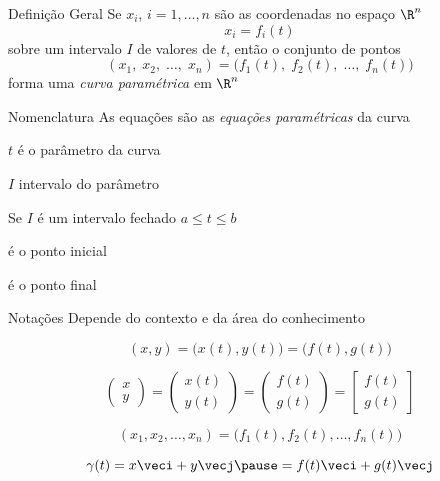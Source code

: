 \documentclass[fleqn,utf8,aspectratio=169,12pt]{beamer}
\begin{document}
\begin{frame}{Definição Geral}
  Se $x_i$, $i=1, \dots, n$ são as coordenadas no espaço $\R^n$
  \[
    x_i = f_i(t)
  \]
  sobre um intervalo $I$ de valores de $t$,
  então o conjunto de pontos
  \[
    (x_1,\; x_2,\; \dots,\; x_n) = \big( f_1(t),\; f_2(t),\; \dots,\; f_n(t)\big)
  \]
  forma uma \emph{curva paramétrica} em $\R^n$
\end{frame}

\begin{frame}{Nomenclatura}
  As equações são as \emph{equações paramétricas} da curva

  \pause
  \medskip
  \emph{$t$} \quad é o parâmetro da curva

  \pause
  \emph{$I$} \quad intervalo do parâmetro

  \pause
  \medskip
  Se $I$ é um intervalo fechado \emph{\(a\leq t \leq b\)}
  \pause
  \begin{description}[<+->]
    \item[\(\big(f(a), g(a)\big)\)] é o ponto inicial
    \item[\(\big(f(b), g(b)\big)\)] é o ponto final
  \end{description}
\end{frame}

\begin{frame}{Notações}
  Depende do contexto e da área do conhecimento

  \pause
  \[
    (x, y)
    = \big(x(t), y(t)\big)
    = \big(f(t), g(t)\big)
  \]

  \pause
  \[
      \begin{pmatrix}  x    \\ y    \end{pmatrix}
    = \begin{pmatrix}  x(t) \\ y(t) \end{pmatrix}
    = \begin{pmatrix}  f(t) \\ g(t) \end{pmatrix}
    = \begin{bmatrix}  f(t) \\ g(t) \end{bmatrix}
  \]

  \pause
  \[
    (x_1, x_2, \dots, x_n) = \big( f_1(t), f_2(t), \dots, f_n(t)\big)
  \]

  \pause
  \[
    \gamma(t)
    = x\veci + y\vecj
    \pause
    = f(t)\veci + g(t)\vecj
  \]
\end{frame}
\end{document}
